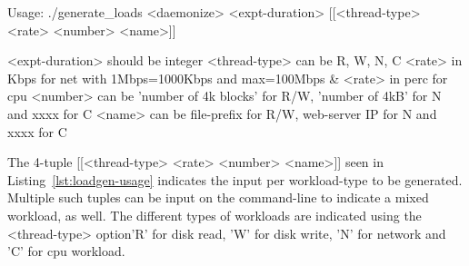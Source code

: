 \begin{snippet}
Usage: ./generate_loads <daemonize> <expt-duration> [[<thread-type> <rate> <number> <name>]]

<expt-duration> should be integer
<thread-type> can be R, W, N, C
<rate> in Kbps for net with 1Mbps=1000Kbps and max=100Mbps & <rate> in perc for cpu
<number> can be 'number of 4k blocks' for R/W, 'number of 4kB' for N and xxxx for C
<name> can be file-prefix for R/W, web-server IP for N and xxxx for C
\end{snippet}

The 4-tuple [[<thread-type> <rate> <number> <name>]] seen in Listing~\ref{lst:loadgen-usage}
indicates the input per workload-type to be generated. Multiple such tuples can be input
on the command-line to indicate a mixed workload, as well. The different types of workloads
are indicated using the <thread-type> option\textemdash{}'R' for disk read, 'W' for disk write, 
'N' for network and 'C' for cpu workload. 
